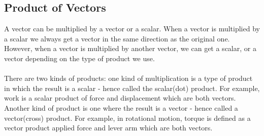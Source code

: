 \documentclass[9pt]{article}
\begin{document}
\subsection*{Product of Vectors}
A vector can be multiplied by a vector or a scalar. When a vector is multiplied by a scalar we always get a vector in the same direction as the original one. However, when a vector is multiplied by another vector, we can get a scalar, or a vector depending on the type of product we use. \\ \\
There are two kinds of products: one kind of multiplication is a type of product in which the result is a scalar - hence called the scalar(dot) product. For example, work is a scalar product of force and displacement which are both vectors. Another kind of product is one where the result is a vector - hence called a vector(cross) product. For example, in rotational motion, torque is defined as a vector product applied force and lever arm which are both vectors. 
\end{document}
